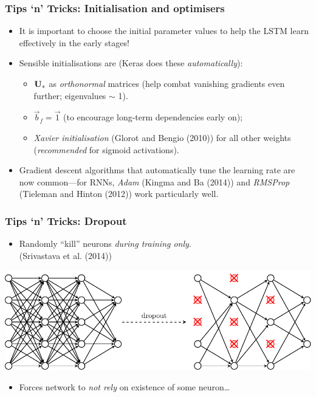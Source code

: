 \documentclass{beamer}
\begin{document}
\begin{frame}
	\frametitle{Tips `n' Tricks: Initialisation and optimisers}
	\begin{itemize}
		\item It is important to choose the initial parameter values to help the LSTM learn effectively in the early stages!
		\vfill
		\item Sensible initialisations are (Keras does these \emph{automatically}):
		\begin{itemize}
			\item ${\bf U}_*$ as \emph{orthonormal} matrices (help combat vanishing gradients even further; eigenvalues $\sim$ 1).
			\item $\vec{b}_f = \vec{1}$ (to encourage long-term dependencies early on); 
			\item \emph{Xavier initialisation} (Glorot and Bengio (2010)) for all other weights (\emph{recommended} for sigmoid activations).
		\end{itemize}
		\vfill
		\item Gradient descent algorithms that automatically tune the learning rate are now common---for RNNs, \emph{Adam} (Kingma and Ba (2014)) and \emph{RMSProp} (Tieleman and Hinton (2012)) work particularly well.
	\end{itemize}
\end{frame}

\begin{frame}
	\frametitle{Tips `n' Tricks: Dropout}
	\begin{itemize}
		\item Randomly ``kill'' neurons \emph{during training only}.\\ (Srivastava et al. (2014))
	\end{itemize}
	\vfill
	\begin{center}
	\includegraphics[width=1.0\linewidth]{dropout.pdf}
	\end{center}
	\vfill
	\begin{itemize}
		\item Forces network to \emph{not rely} on existence of some neuron\dots
	\end{itemize}
\end{frame}
\end{document}
